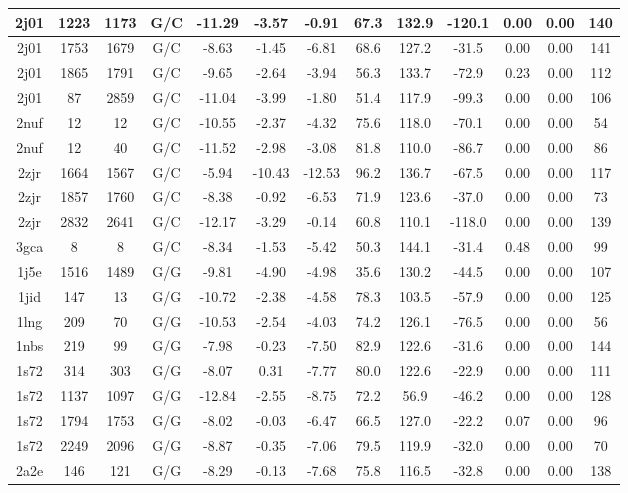{\begin{center}
\begin{longtable}{|c|c|c|c|c|c|c|c|c|c|c|c|c|}
2j01 & 1223 & 1173 & G/C & -11.29 & -3.57 & -0.91 & 67.3 & 132.9 & -120.1 & 0.00 & 0.00 & 140 \\ \hline
2j01 & 1753 & 1679 & G/C & -8.63 & -1.45 & -6.81 & 68.6 & 127.2 & -31.5 & 0.00 & 0.00 & 141 \\ \hline
2j01 & 1865 & 1791 & G/C & -9.65 & -2.64 & -3.94 & 56.3 & 133.7 & -72.9 & 0.23 & 0.00 & 112 \\ \hline
2j01 & 87 & 2859 & G/C & -11.04 & -3.99 & -1.80 & 51.4 & 117.9 & -99.3 & 0.00 & 0.00 & 106 \\ \hline
2nuf & 12 & 12 & G/C & -10.55 & -2.37 & -4.32 & 75.6 & 118.0 & -70.1 & 0.00 & 0.00 & 54 \\ \hline
2nuf & 12 & 40 & G/C & -11.52 & -2.98 & -3.08 & 81.8 & 110.0 & -86.7 & 0.00 & 0.00 & 86 \\ \hline
2zjr & 1664 & 1567 & G/C & -5.94 & -10.43 & -12.53 & 96.2 & 136.7 & -67.5 & 0.00 & 0.00 & 117 \\ \hline
2zjr & 1857 & 1760 & G/C & -8.38 & -0.92 & -6.53 & 71.9 & 123.6 & -37.0 & 0.00 & 0.00 & 73 \\ \hline
2zjr & 2832 & 2641 & G/C & -12.17 & -3.29 & -0.14 & 60.8 & 110.1 & -118.0 & 0.00 & 0.00 & 139 \\ \hline
3gca & 8 & 8 & G/C & -8.34 & -1.53 & -5.42 & 50.3 & 144.1 & -31.4 & 0.48 & 0.00 & 99 \\ \hline
1j5e & 1516 & 1489 & G/G & -9.81 & -4.90 & -4.98 & 35.6 & 130.2 & -44.5 & 0.00 & 0.00 & 107 \\ \hline
1jid & 147 & 13 & G/G & -10.72 & -2.38 & -4.58 & 78.3 & 103.5 & -57.9 & 0.00 & 0.00 & 125 \\ \hline
1lng & 209 & 70 & G/G & -10.53 & -2.54 & -4.03 & 74.2 & 126.1 & -76.5 & 0.00 & 0.00 & 56 \\ \hline
1nbs & 219 & 99 & G/G & -7.98 & -0.23 & -7.50 & 82.9 & 122.6 & -31.6 & 0.00 & 0.00 & 144 \\ \hline
1s72 & 314 & 303 & G/G & -8.07 & 0.31 & -7.77 & 80.0 & 122.6 & -22.9 & 0.00 & 0.00 & 111 \\ \hline
1s72 & 1137 & 1097 & G/G & -12.84 & -2.55 & -8.75 & 72.2 & 56.9 & -46.2 & 0.00 & 0.00 & 128 \\ \hline
1s72 & 1794 & 1753 & G/G & -8.02 & -0.03 & -6.47 & 66.5 & 127.0 & -22.2 & 0.07 & 0.00 & 96 \\ \hline
1s72 & 2249 & 2096 & G/G & -8.87 & -0.35 & -7.06 & 79.5 & 119.9 & -32.0 & 0.00 & 0.00 & 70 \\ \hline
2a2e & 146 & 121 & G/G & -8.29 & -0.13 & -7.68 & 75.8 & 116.5 & -32.8 & 0.00 & 0.00 & 138 \\ \hline

\end{longtable}
\end{center}}
